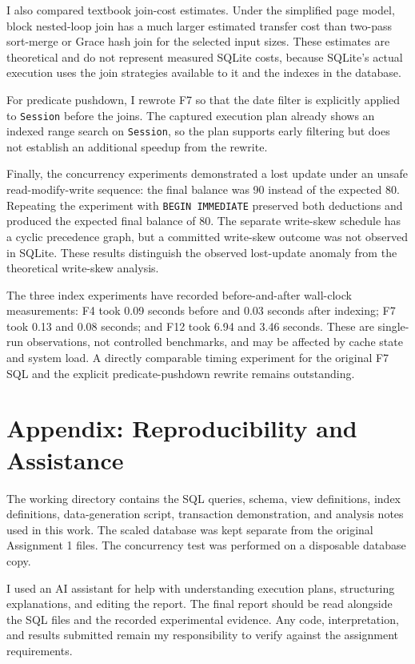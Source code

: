 \documentclass[11pt,a4paper]{article}
\begin{document}
I also compared textbook join-cost estimates. Under the simplified
page model, block nested-loop join has a much larger estimated
transfer cost than two-pass sort-merge or Grace hash join for the
selected input sizes. These estimates are theoretical and do not
represent measured SQLite costs, because SQLite's actual execution
uses the join strategies available to it and the indexes in the
database.

For predicate pushdown, I rewrote F7 so that the date filter is
explicitly applied to \texttt{Session} before the joins. The captured
execution plan already shows an indexed range search on
\texttt{Session}, so the plan supports early filtering but does
not establish an additional speedup from the rewrite.

Finally, the concurrency experiments demonstrated a lost update
under an unsafe read-modify-write sequence: the final balance
was 90 instead of the expected 80. Repeating the experiment with
\texttt{BEGIN IMMEDIATE} preserved both deductions and produced
the expected final balance of 80. The separate write-skew schedule
has a cyclic precedence graph, but a committed write-skew outcome
was not observed in SQLite. These results distinguish the observed
lost-update anomaly from the theoretical write-skew analysis.

The three index experiments have recorded before-and-after
wall-clock measurements: F4 took 0.09 seconds before and 0.03
seconds after indexing; F7 took 0.13 and 0.08 seconds; and F12
took 6.94 and 3.46 seconds. These are single-run observations,
not controlled benchmarks, and may be affected by cache state
and system load. A directly comparable timing experiment for the
original F7 SQL and the explicit predicate-pushdown rewrite
remains outstanding.

\section*{Appendix: Reproducibility and Assistance}

The working directory contains the SQL queries, schema, view
definitions, index definitions, data-generation script, transaction
demonstration, and analysis notes used in this work. The scaled
database was kept separate from the original Assignment 1 files.
The concurrency test was performed on a disposable database copy.

I used an AI assistant for help with understanding execution plans,
structuring explanations, and editing the report. The final report
should be read alongside the SQL files and the recorded experimental
evidence. Any code, interpretation, and results submitted remain
my responsibility to verify against the assignment requirements.
\end{document}
